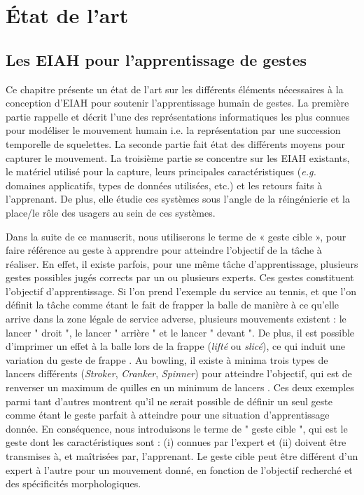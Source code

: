 \part{État de l'art}
\chapter{Les EIAH pour l'apprentissage de gestes}
Ce chapitre présente un état de l'art sur les différents éléments nécessaires à la conception d'EIAH pour soutenir l'apprentissage humain de gestes. La première partie rappelle et décrit l'une des représentations informatiques les plus connues pour modéliser le mouvement humain i.e. la représentation par une succession temporelle de squelettes. La seconde partie fait état des différents moyens pour capturer le mouvement. La troisième partie se concentre sur les EIAH existants, le matériel utilisé pour la capture, leurs principales caractéristiques (\textit{e.g.} domaines applicatifs, types de données utilisées, etc.) et les retours faits à l'apprenant. De plus, elle étudie ces systèmes sous l'angle de la réingénierie et la place/le rôle des usagers au sein de ces systèmes.


Dans la suite de ce manuscrit, nous utiliserons le terme de « geste cible », pour faire référence au geste à apprendre pour atteindre l'objectif de la tâche à réaliser. En effet, il existe parfois, pour une même tâche d'apprentissage, plusieurs gestes possibles jugés corrects par un ou plusieurs experts. Ces gestes constituent l’objectif d’apprentissage. Si l'on prend l'exemple du service au tennis, et que l'on définit la tâche comme étant le fait de frapper la balle de manière à ce qu'elle arrive dans la zone légale de service adverse, plusieurs mouvements existent : le lancer " droit ", le lancer " arrière " et le lancer " devant ". De plus, il est possible d'imprimer un effet à la balle lors de la frappe (\textit{lifté} ou \textit{slicé}), ce qui induit une variation du geste de frappe \parencite{Zappala2017IoP}. Au bowling, il existe à minima trois types de lancers différents (\textit{Stroker}, \textit{Cranker}, \textit{Spinner}) pour atteindre l'objectif, qui est de renverser un maximum de quilles en un minimum de lancers  \parencite{Tan2000Cbp}. Ces deux exemples parmi tant d'autres montrent qu'il ne serait possible de définir un seul geste comme étant le geste parfait à atteindre pour une situation d'apprentissage donnée. En conséquence, nous introduisons le terme de " geste cible ", qui est le geste dont les caractéristiques sont : (i) connues par l'expert et (ii) doivent être transmises à, et maîtrisées par, l'apprenant. Le geste cible peut être différent d'un expert à l'autre pour un mouvement donné, en fonction de l'objectif recherché et des spécificités morphologiques.

